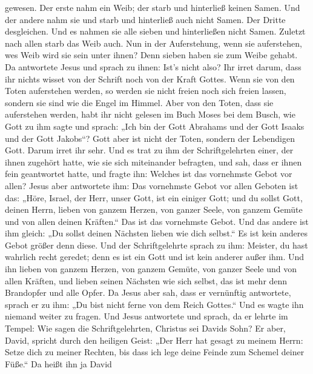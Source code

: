 gewesen. Der erste nahm ein Weib; der starb und hinterließ keinen Samen.
 Und der andere nahm sie und starb und hinterließ auch
nicht Samen. Der Dritte desgleichen.  Und es nahmen sie
alle sieben und hinterließen nicht Samen. Zuletzt nach allen starb das
Weib auch.  Nun in der Auferstehung, wenn sie auferstehen,
wes Weib wird sie sein unter ihnen? Denn sieben haben sie zum Weibe
gehabt.  Da antwortete Jesus und sprach zu ihnen: Ist's
nicht also? Ihr irret darum, dass ihr nichts wisset von der Schrift noch
von der Kraft Gottes.  Wenn sie von den Toten auferstehen
werden, so werden sie nicht freien noch sich freien lassen, sondern sie
sind wie die Engel im Himmel.  Aber von den Toten, dass sie
auferstehen werden, habt ihr nicht gelesen im Buch Moses bei dem Busch,
wie Gott zu ihm sagte und sprach: „Ich bin der Gott Abrahams und der
Gott Isaaks und der Gott Jakobs``?  Gott aber ist nicht der
Toten, sondern der Lebendigen Gott. Darum irret ihr sehr. 
Und es trat zu ihm der Schriftgelehrten einer, der ihnen zugehört hatte,
wie sie sich miteinander befragten, und sah, dass er ihnen fein
geantwortet hatte, und fragte ihn: Welches ist das vornehmste Gebot vor
allen?  Jesus aber antwortete ihm: Das vornehmste Gebot vor
allen Geboten ist das: „Höre, Israel, der Herr, unser Gott, ist ein
einiger Gott;  und du sollst Gott, deinen Herrn, lieben von
ganzem Herzen, von ganzer Seele, von ganzem Gemüte und von allen deinen
Kräften.`` Das ist das vornehmste Gebot.  Und das andere
ist ihm gleich: „Du sollst deinen Nächsten lieben wie dich selbst.`` Es
ist kein anderes Gebot größer denn diese.  Und der
Schriftgelehrte sprach zu ihm: Meister, du hast wahrlich recht geredet;
denn es ist ein Gott und ist kein anderer außer ihm.  Und
ihn lieben von ganzem Herzen, von ganzem Gemüte, von ganzer Seele und
von allen Kräften, und lieben seinen Nächsten wie sich selbst, das ist
mehr denn Brandopfer und alle Opfer.  Da Jesus aber sah,
dass er vernünftig antwortete, sprach er zu ihm: „Du bist nicht ferne
von dem Reich Gottes.`` Und es wagte ihn niemand weiter zu fragen.
 Und Jesus antwortete und sprach, da er lehrte im Tempel:
Wie sagen die Schriftgelehrten, Christus sei Davids Sohn? 
Er aber, David, spricht durch den heiligen Geist: „Der Herr hat gesagt
zu meinem Herrn: Setze dich zu meiner Rechten, bis dass ich lege deine
Feinde zum Schemel deiner Füße.``  Da heißt ihn ja David
